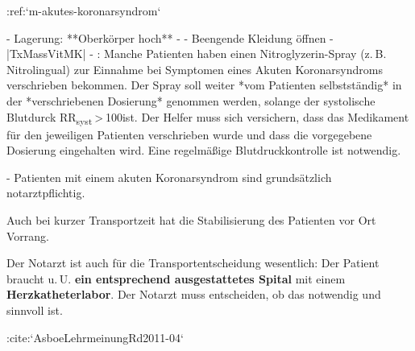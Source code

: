 
:ref:`m-akutes-koronarsyndrom`


\begin{itemize}
    -   Lagerung: **Oberkörper hoch**
  -   
  -   Beengende Kleidung öffnen
  -   |TxMassVitMK|
  -   : Manche Patienten haben einen
  Nitroglyzerin-Spray (z. B. Nitrolingual{\texttrademark})
  zur Einnahme bei Symptomen eines Akuten Koronarsyndroms
  verschrieben bekommen. Der Spray soll weiter *vom
  Patienten selbstständig* in der *verschriebenen
  Dosierung* genommen werden, solange der systolische
  Blutdurck RR\textsubscript{syst} {\textgreater} 100\MmHg*
  ist. Der Helfer muss sich versichern, dass das Medikament
  für den jeweiligen Patienten verschrieben wurde und dass
  die vorgegebene Dosierung eingehalten wird. Eine
  regelmäßige Blutdruckkontrolle ist notwendig.
\end{itemize}


\begin{Danger}
  -   Patienten mit einem akuten Koronarsyndrom sind 
  grundsätzlich notarztpflichtig.
\end{Danger}

Auch bei kurzer Transportzeit hat die Stabilisierung des 
Patienten vor Ort Vorrang. 

Der Notarzt ist auch für die Transportentscheidung wesentlich: 
Der Patient braucht u. U. {\bfseries ein entsprechend
ausgestattetes Spital} mit einem {\bfseries
{} Herzkatheterlabor}. Der Notarzt muss
entscheiden, ob das notwendig und sinnvoll ist.

:cite:`AsboeLehrmeinungRd2011-04`\ 
